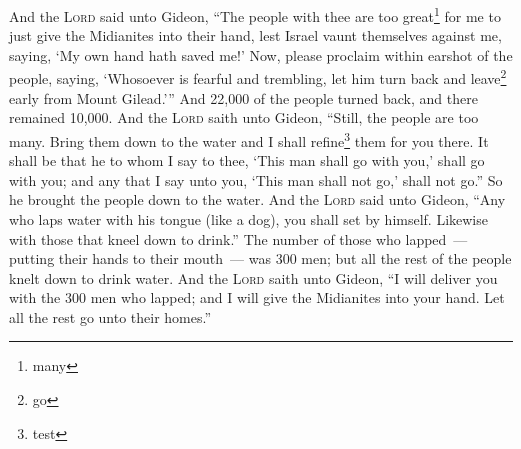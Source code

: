 


\begin{enumerate*}[mode=unboxed]
     And the \textsc{Lord} said unto Gideon, ``The people with thee are too great\footnote{many} for me to just give the Midianites into their hand, lest Israel vaunt themselves against me, saying, `My own hand hath saved me!'%
     Now, please proclaim within earshot of the people, saying, `Whosoever is fearful and trembling, let him turn back and leave\footnote{go} early from Mount Gilead.''' And 22,000 of the people turned back, and there remained 10,000.%
     And the \textsc{Lord} saith unto Gideon, ``Still, the people are too many. Bring them down to the water and I shall refine\footnote{test} them for you there. It shall be that he to whom I say to thee, `This man shall go with you,' shall go with you; and any that I say unto you, `This man shall not go,' shall not go.''%
     So he brought the people down to the water. And the \textsc{Lord} said unto Gideon, ``Any who laps water with his tongue (like a dog), you shall set by himself. Likewise with those that kneel down to drink.''%
     The number of those who lapped~--- putting their hands to their mouth~--- was 300 men; but all the rest of the people knelt down to drink water.%
     And the \textsc{Lord} saith unto Gideon, ``I will deliver you with the 300 men who lapped; and I will give the Midianites into your hand. Let all the rest go unto their homes.''%
\end{enumerate*}
